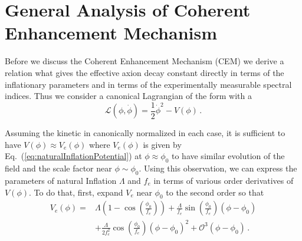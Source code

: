 \documentclass[12pt]{article}
\begin{document}
\section{General Analysis of Coherent Enhancement Mechanism \label{sec:CoherentEnhancement}}
Before we discuss the Coherent Enhancement Mechanism (CEM) we derive a relation what gives the effective axion decay constant directly in terms of the inflationary parameters and in terms of the experimentally measurable spectral indices.
Thus we consider a canonical Lagrangian of the form with a
\begin{equation}
  \mathcal{L}\left(\phi, \dot{\phi}\right) = \frac{1}{2}{\dot{\phi}}^2 - V\left(\phi\right)\,.
\end{equation}

Assuming the kinetic in canonically normalized in each case, it is sufficient to have $V\left(\phi\right) \approx V_{e}\left(\phi\right)$ where $V_{e}\left(\phi\right)$ is given by Eq.~(\ref{eq:naturalInflationPotential}) at $\phi \approx \phi_0$ to have similar evolution of the field and the scale factor near $\phi \sim \phi_0$.
Using this observation, we can express the parameters of natural Inflation $\Lambda$ and $f_e$ in terms of various order derivatives of $V\left(\phi\right)$.
To do that, first, expand $V_{e}$ near $\phi_0$ to the second order so that
\begin{equation} \label{eq:naturalInflationSeries}
  \begin{aligned}
    V_{e}\left(\phi\right) =
      &\Lambda \left(1 - \cos\left(\frac{\phi_0}{f_e}\right)\right)
        + \frac{\Lambda}{f_e} \sin\left(\frac{\phi_0}{f_e}\right) \left(\phi - \phi_0\right)\\
      & + \frac{\Lambda}{2 f_e^2} \cos\left(\frac{\phi_0}{f_e}\right) \left(\phi - \phi_0\right)^2
        + \mathcal{O}^3\left(\phi - \phi_0\right)\,.
  \end{aligned}
\end{equation}
\end{document}
